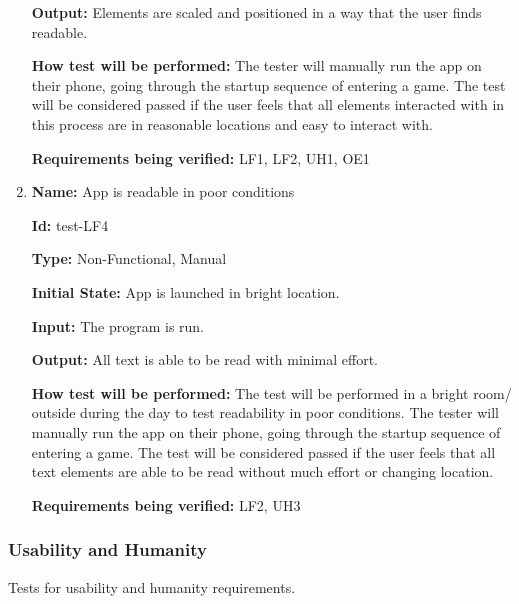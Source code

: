 \documentclass[12pt, titlepage]{article}
\begin{document}
\begin{enumerate}
\textbf{Output:} Elements are scaled and positioned in a way that the user finds readable. 
					
\textbf{How test will be performed:} The tester will manually run the app on their phone, going through the startup sequence of entering a game. The test will be considered passed if the user feels that all elements interacted with in this process are in reasonable locations and easy to interact with.

\textbf{Requirements being verified:} LF1, LF2, UH1, OE1

\item{\textbf{Name:} App is readable in poor conditions}

\textbf{Id:} test-LF4

\textbf{Type:} Non-Functional, Manual
					
\textbf{Initial State:} App is launched in bright location.  
					
\textbf{Input:} The program is run.  
					
\textbf{Output:} All text is able to be read with minimal effort. 
					
\textbf{How test will be performed:} The test will be performed in a bright room/ outside during the day to test readability in poor conditions. The tester will manually run the app on their phone, going through the startup sequence of entering a game. The test will be considered passed if the user feels that all text elements are able to be read without much effort or changing location. 

\textbf{Requirements being verified:} LF2, UH3

\end{enumerate}

\subsubsection{Usability and Humanity}
Tests for usability and humanity requirements.
\end{document}
